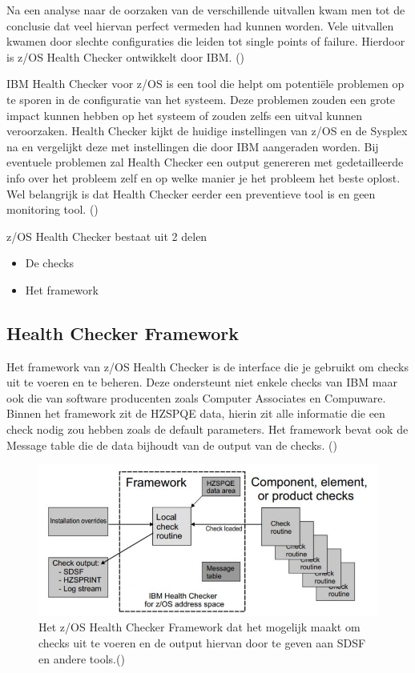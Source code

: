 Na een analyse naar de oorzaken van de verschillende uitvallen kwam men tot de conclusie dat veel hiervan perfect vermeden had kunnen worden. Vele uitvallen kwamen door slechte configuraties die leiden tot single points of failure. Hierdoor is z/OS Health Checker ontwikkelt door IBM. (\cite{Walle2013})

IBM Health Checker voor z/OS is een tool die helpt om potentiële problemen op te sporen in de configuratie van het systeem. Deze problemen zouden een grote impact kunnen hebben op het systeem of zouden zelfs een uitval kunnen veroorzaken. Health Checker kijkt de huidige instellingen van z/OS en de Sysplex na en vergelijkt deze met instellingen die door IBM aangeraden worden. Bij eventuele problemen zal Health Checker een output genereren met gedetailleerde info over het probleem zelf en op welke manier je het probleem het beste oplost. Wel belangrijk is dat Health Checker eerder een preventieve tool is en geen monitoring tool. (\cite{Bezzi2010})

z/OS Health Checker bestaat uit 2 delen
\begin{itemize}
	\item De checks
	\item Het framework	
\end{itemize}

\subsection{Health Checker Framework}
\label{subsec:Health Checker Framework}

Het framework van z/OS Health Checker is de interface die je gebruikt om checks uit te voeren en te beheren. Deze ondersteunt niet enkele checks van IBM maar ook die van software producenten zoals Computer Associates en Compuware. Binnen het framework zit de HZSPQE data, hierin zit alle informatie die een check nodig zou hebben zoals de default parameters.  Het framework bevat ook de Message table die de data bijhoudt van de output van de checks. (\cite{IBMCorporation2019})

\begin{figure}[h]
	\centering
	\includegraphics[width=0.7\linewidth]{img/HCFramework}
	\caption[z/OS Health Checker Framework]{Het z/OS Health Checker Framework dat het mogelijk maakt om checks uit te voeren en de output hiervan door te geven aan SDSF en andere tools.(\cite{IBMCorporation2019})}
	\label{fig:hcframework}
\end{figure}


